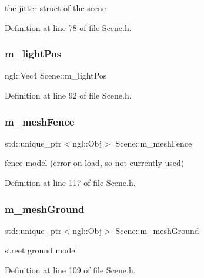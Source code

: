 the jitter struct of the scene 



Definition at line 78 of file Scene.\+h.

\mbox{\label{class_scene_afd9dcd01ae1bd959bc1c06ead8b8f026}} 
\subsubsection{m\_lightPos}
{\footnotesize\ttfamily ngl\+::\+Vec4 Scene\+::m\+\_\+light\+Pos\hspace{0.3cm}{\ttfamily [private]}}



Definition at line 92 of file Scene.\+h.

\mbox{\label{class_scene_a5d30505b09ef62949d514735dcfda0f1}} 
\subsubsection{m\_meshFence}
{\footnotesize\ttfamily std\+::unique\+\_\+ptr$<$ngl\+::\+Obj$>$ Scene\+::m\+\_\+mesh\+Fence\hspace{0.3cm}{\ttfamily [private]}}



fence model (error on load, so not currently used) 



Definition at line 117 of file Scene.\+h.

\mbox{\label{class_scene_ad62796048dade134b09c522e55fe2d15}} 
\subsubsection{m\_meshGround}
{\footnotesize\ttfamily std\+::unique\+\_\+ptr$<$ngl\+::\+Obj$>$ Scene\+::m\+\_\+mesh\+Ground\hspace{0.3cm}{\ttfamily [private]}}



street ground model 



Definition at line 109 of file Scene.\+h.

\mbox{\label{class_scene_a04589652baceed417d3270e9053190d6}} 
